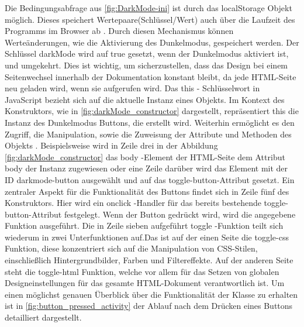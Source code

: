 \documentclass[11pt,a4paper]{report}
\begin{document}
\noindent
Die Bedingungsabfrage aus \ref{fig:DarkMode-ini} ist durch das localStorage Objekt möglich. Dieses speichert Wertepaare(Schlüssel/Wert) auch über die Laufzeit des Programms im Browser ab \cite{localStorage_Objekt}. Durch diesen Mechanismus können Werteänderungen, wie die Aktivierung des Dunkelmodus, gespeichert werden. Der Schlüssel \glqq darkMode \grqq{} wird auf \glqq true \grqq{} gesetzt, wenn der Dunkelmodus aktiviert ist, und umgekehrt. Dies ist wichtig, um sicherzustellen, dass das Design bei einem Seitenwechsel innerhalb der Dokumentation konstant bleibt, da jede HTML-Seite neu geladen wird, wenn sie aufgerufen wird. Das \glqq this \grqq{}- Schlüsselwort in JavaScript bezieht sich auf die aktuelle Instanz eines Objekts. Im Kontext des Konstruktors, wie in \ref{fig:darkMode_constructor} dargestellt, repräsentiert \glqq this \grqq{} die Instanz des Dunkelmodus Buttons, die erstellt wird. Weiterhin ermöglicht es den Zugriff, die Manipulation, sowie die Zuweisung der Attribute und Methoden des Objekts \cite{this_keyword}. Beispielsweise wird in Zeile drei in der Abbildung \ref{fig:darkMode_constructor} das \glqq body \grqq{}-Element der HTML-Seite dem Attribut \glqq body \grqq{} der Instanz zugewiesen oder eine Zeile darüber wird das Element mit der ID \glqq darkmode-button \grqq{} ausgewählt und auf das \glqq toggle-button\grqq{}-Attribut gesetzt. Ein zentraler Aspekt für die Funktionalität des Buttons findet sich in Zeile fünf des Konstruktors. Hier wird ein \glqq onclick \grqq{}-Handler für das bereits bestehende \glqq toggle-button\grqq{}-Attribut festgelegt. Wenn der Button gedrückt wird, wird die angegebene Funktion ausgeführt. Die in Zeile sieben aufgeführt \glqq toggle \grqq{}-Funktion teilt sich wiederum in zwei Unterfunktionen auf.\newpage Das ist auf der einen Seite die \glqq toggle-css \grqq{} Funktion, diese konzentriert sich auf die Manipulation von CSS-Stilen, einschließlich Hintergrundbilder, Farben und Filtereffekte. Auf der anderen Seite steht die \glqq toggle-html \grqq{} Funktion, welche vor allem für das Setzen von globalen Designeinstellungen für das gesamte HTML-Dokument verantwortlich ist. Um einen möglichst genauen Überblick über die Funktionalität der Klasse zu erhalten ist in \ref{fig:button_pressed_activity} der Ablauf nach dem Drücken eines Buttons detailliert dargestellt. 
\end{document}
